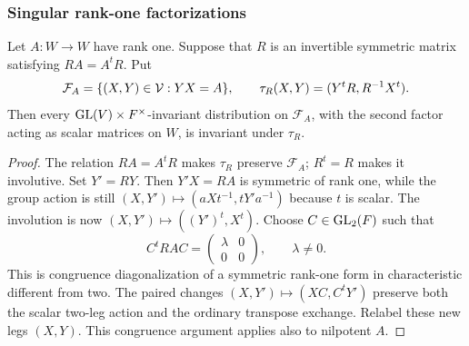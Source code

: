\subsubsection{Singular rank-one factorizations}\label{m1:subsec:rankone-factorization}

\begin{lemma}\label{m1:lem:rank-one-factorization}
Let $A:W\to W$ have rank one. Suppose that $R$ is an invertible
symmetric matrix satisfying $RA=A^tR$. Put
\[
 \mathcal F_A=\{(X,Y)\in \mathcal V:YX=A\},\qquad
 \tau_R(X,Y)=(Y^tR,R^{-1}X^t).
\]
Then every $\operatorname{GL}(V)\times F^\times$-invariant distribution on
$\mathcal F_A$, with the second factor acting as scalar matrices on $W$,
is invariant under $\tau_R$.
\end{lemma}

\begin{proof}
The relation $RA=A^tR$ makes $\tau_R$ preserve $\mathcal F_A$;
$R^t=R$ makes it involutive. Set $Y'=RY$. Then $Y'X=RA$ is symmetric
of rank one, while the group action is still
$(X,Y')\mapsto(aXt^{-1},tY'a^{-1})$ because $t$ is scalar.
The involution is now $(X,Y')\mapsto((Y')^t,X^t)$.
Choose $C\in\operatorname{GL}_2(F)$ such that
\[
 C^tRA C=\begin{pmatrix}\lambda&0\\0&0\end{pmatrix},\qquad\lambda\ne0.
\]
This is congruence diagonalization of a symmetric rank-one form in
characteristic different from two. The paired changes
$(X,Y')\mapsto(XC,C^tY')$ preserve both the scalar two-leg action and
the ordinary transpose exchange. Relabel these new legs $(X,Y)$.
This congruence argument applies also to nilpotent $A$.


\end{proof}
